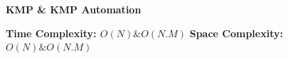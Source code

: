 \textbf{KMP & KMP Automation}

\textbf{Time Complexity: $O(N) \& O(N.M )$}
\textbf{Space Complexity: $O(N) \& O(N.M)$}

